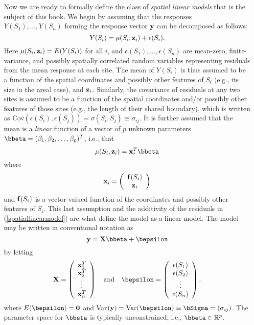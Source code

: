 Now we are ready to formally define the class of {\em spatial linear models} that is the subject of this book.  We begin by assuming that the responses $Y(S_1),\ldots,Y(S_n)$ forming the response vector ${\bf y}$ can be decomposed as follows:
\begin{equation}\label{spatiallinearmodel}
Y(S_i) = \mu(S_i,{\bf z}_i)+\epsilon(S_i).
\end{equation}
Here $\mu(S_i,{\bf z}_i)=E(Y(S_i))$ for all $i$, and $\epsilon(S_1),\ldots,\epsilon(S_n)$ are mean-zero, finite-variance, and possibly spatially correlated random variables representing residuals from the mean response at each site.  The mean of $Y(S_i)$ is thus assumed to be a function of the spatial coordinates and possibly other features of $S_i$ (e.g., its size in the areal case), and ${\bf z}_i$.  Similarly, the covariance of residuals at any two sites is assumed to be a function of the spatial coordinates and/or possibly other features of those sites (e.g., the length of their shared boundary), which is written as Cov$(\epsilon(S_i),\epsilon(S_j))=\sigma(S_i,S_j)\equiv\sigma_{ij}$.  It is further assumed that the mean is a {\em linear} function of a vector of $p$ unknown parameters $\bbeta=(\beta_1,\beta_2,\ldots,\beta_p)^T$, i.e., that 
\[ \mu(S_i,{\bf z}_i)={\bf x}_i^T\bbeta \]
where
\[ {\bf x}_i=\left(\begin{array}{c}{\bf f}(S_i) \\ {\bf z}_i\end{array}\right) \]
and ${\bf f}(S_i)$ is a vector-valued function of the coordinates and possibly other features of $S_i$.  This last assumption and the additivity of the residuals in (\ref{spatiallinearmodel}) are what define the model as a linear model.  The model may be written in conventional notation as
\begin{equation}\label{succinctslm}
{\bf y}={\bf X}\bbeta+\bepsilon
\end{equation}
by letting
\[ {\bf X}=\left(\begin{array}{c}{\bf x}_1^T \\ {\bf x}_2^T \\ \vdots \\ {\bf x}_n^T\end{array}\right)\quad\mbox{and}\quad\bepsilon=\left(\begin{array}{c}\epsilon(S_1)\\\epsilon(S_2)\\ \vdots \\ \epsilon(S_n)\end{array}\right), \]
where $E(\bepsilon)={\bf 0}$ and Var$({\bf y})=\mbox{Var}(\bepsilon)\equiv\bSigma=(\sigma_{ij})$.  The parameter space for $\bbeta$ is typically unconstrained, i.e., $\bbeta\in\mathbb{R}^p$.

